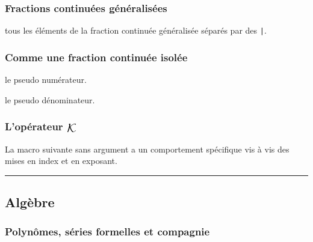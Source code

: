 \documentclass[12pt,a4paper]{article}
\theoremstyle{definition}
\newcommand\separation{
	\medskip
	\hfill\rule{0.5\textwidth}{0.75pt}\hfill
	\medskip
}
\newcommand\extraspace{
	\vspace{0.25em}
}
\begin{document}



\subsubsection{Fractions continuées généralisées}



\IDarg{} tous les éléments de la fraction continuée généralisée séparés par des \verb+|+.





\subsubsection{Comme une fraction continuée isolée}


 le pseudo numérateur.

 le pseudo dénominateur.





\subsubsection{\texorpdfstring{L'opérateur $\contfracope$}%
                          {L'opérateur K}}

La macro suivante sans argument a un comportement spécifique vis à vis des mises en index et en exposant. 


\separation


\subsection{Algèbre}

\subsubsection{Polynômes, séries formelles et compagnie}



\extraspace


\end{document}
